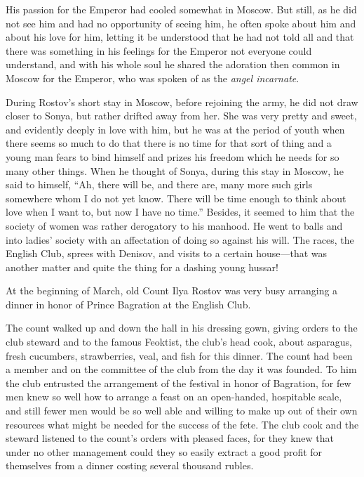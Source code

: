 His passion for the Emperor had cooled somewhat in Moscow. But
still, as he did not see him and had no opportunity of seeing
him, he often spoke about him and about his love for him, letting
it be understood that he had not told all and that there was
something in his feelings for the Emperor not everyone could
understand, and with his whole soul he shared the adoration then
common in Moscow for the Emperor, who was spoken of as the
\emph{angel incarnate}.

During Rostov's short stay in Moscow, before rejoining the army,
he did not draw closer to Sonya, but rather drifted away from
her. She was very pretty and sweet, and evidently deeply in love
with him, but he was at the period of youth when there seems so
much to do that there is no time for that sort of thing and a
young man fears to bind himself and prizes his freedom which he
needs for so many other things. When he thought of Sonya, during
this stay in Moscow, he said to himself, ``Ah, there will be, and
there are, many more such girls somewhere whom I do not yet
know. There will be time enough to think about love when I want
to, but now I have no time.'' Besides, it seemed to him that the
society of women was rather derogatory to his manhood. He went to
balls and into ladies' society with an affectation of doing so
against his will. The races, the English Club, sprees with
Denisov, and visits to a certain house---that was another matter
and quite the thing for a dashing young hussar!

At the beginning of March, old Count Ilya Rostov was very busy
arranging a dinner in honor of Prince Bagration at the English
Club.

The count walked up and down the hall in his dressing gown,
giving orders to the club steward and to the famous Feoktist, the
club's head cook, about asparagus, fresh cucumbers, strawberries,
veal, and fish for this dinner. The count had been a member and
on the committee of the club from the day it was founded. To him
the club entrusted the arrangement of the festival in honor of
Bagration, for few men knew so well how to arrange a feast on an
open-handed, hospitable scale, and still fewer men would be so
well able and willing to make up out of their own resources what
might be needed for the success of the fete.  The club cook and
the steward listened to the count's orders with pleased faces,
for they knew that under no other management could they so easily
extract a good profit for themselves from a dinner costing
several thousand rubles.

